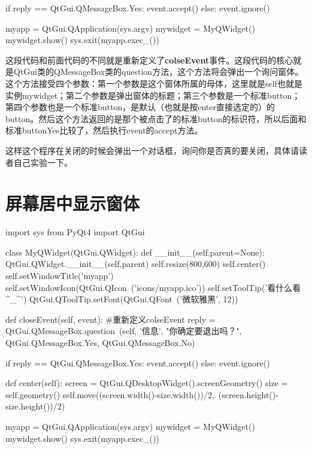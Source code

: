 \documentclass[12pt,oneside]{book}
\begin{document}
\begin{common-format}
\begin{tcbpython}
        if reply == QtGui.QMessageBox.Yes:
            event.accept()
        else:
            event.ignore()

myapp = QtGui.QApplication(sys.argv)
mywidget = MyQWidget()
mywidget.show()
sys.exit(myapp.exec_())
\end{tcbpython}



这段代码和前面代码的不同就是重新定义了\textbf{colseEvent}事件。这段代码的核心就是QtGui类的QMessageBox类的question方法，这个方法将会弹出一个询问窗体。这个方法接受四个参数：第一个参数是这个窗体所属的母体，这里就是self也就是实例mywidget；第二个参数是弹出窗体的标题；第三个参数是一个标准button；第四个参数也是一个标准button，是默认（也就是按enter直接选定的）的button。然后这个方法返回的是那个被点击了的标准button的标识符，所以后面和标准buttonYes比较了，然后执行event的accept方法。

这样这个程序在关闭的时候会弹出一个对话框，询问你是否真的要关闭，具体请读者自己实验一下。

\section{屏幕居中显示窗体}


\begin{tcbpython}
import sys
from PyQt4  import QtGui

class MyQWidget(QtGui.QWidget):
    def __init__(self,parent=None):
        QtGui.QWidget.__init__(self,parent)
        self.resize(800,600)
        self.center()
        self.setWindowTitle('myapp')
        self.setWindowIcon(QtGui.QIcon\
        ('icons/myapp.ico'))
        self.setToolTip('看什么看^_^')
        QtGui.QToolTip.setFont(QtGui.QFont\
        ('微软雅黑', 12))

    def closeEvent(self, event):
        #重新定义colseEvent
        reply = QtGui.QMessageBox.question\
        (self, '信息',
            "你确定要退出吗？",
             QtGui.QMessageBox.Yes,
             QtGui.QMessageBox.No)

        if reply == QtGui.QMessageBox.Yes:
            event.accept()
        else:
            event.ignore()
            
    def center(self):
        screen = QtGui.QDesktopWidget().screenGeometry()
        size =  self.geometry()
        self.move((screen.width()-size.width())/2,\
         (screen.height()-size.height())/2)

myapp = QtGui.QApplication(sys.argv)
mywidget = MyQWidget()
mywidget.show()
sys.exit(myapp.exec_())
\end{tcbpython}




\end{common-format}
\end{document}
